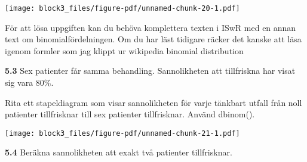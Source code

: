 \documentclass[
  letterpaper,
  DIV=11,
  numbers=noendperiod]{scrartcl}
\newenvironment{Shaded}{\begin{snugshade}}{\end{snugshade}}
\newcommand{\AttributeTok}[1]{\textcolor[rgb]{0.40,0.45,0.13}{#1}}
\newcommand{\CommentTok}[1]{\textcolor[rgb]{0.37,0.37,0.37}{#1}}
\newcommand{\ControlFlowTok}[1]{\textcolor[rgb]{0.00,0.23,0.31}{\textbf{#1}}}
\newcommand{\DecValTok}[1]{\textcolor[rgb]{0.68,0.00,0.00}{#1}}
\newcommand{\FloatTok}[1]{\textcolor[rgb]{0.68,0.00,0.00}{#1}}
\newcommand{\FunctionTok}[1]{\textcolor[rgb]{0.28,0.35,0.67}{#1}}
\newcommand{\NormalTok}[1]{\textcolor[rgb]{0.00,0.23,0.31}{#1}}
\newcommand{\OtherTok}[1]{\textcolor[rgb]{0.00,0.23,0.31}{#1}}
\newcommand{\SpecialCharTok}[1]{\textcolor[rgb]{0.37,0.37,0.37}{#1}}
\begin{document}
\texttt{[image: block3\_files/figure-pdf/unnamed-chunk-20-1.pdf]}

För att lösa uppgiften kan du behöva komplettera texten i ISwR med en
annan text om binomialfördelningen. Om du har läst tidigare räcker det
kanske att läsa igenom formler som jag klippt ur wikipedia binomial
distribution

\textbf{5.3} Sex patienter får samma behandling. Sannolikheten att
tillfriskna har visat sig vara 80\%.

Rita ett stapeldiagram som visar sannolikheten för varje tänkbart utfall
från noll patienter tillfrisknar till sex patienter tillfrisknar. Använd
dbinom().

\begin{Shaded}
\end{Shaded}

\texttt{[image: block3\_files/figure-pdf/unnamed-chunk-21-1.pdf]}

\textbf{5.4} Beräkna sannolikheten att exakt två patienter tillfrisknar.
\end{document}
